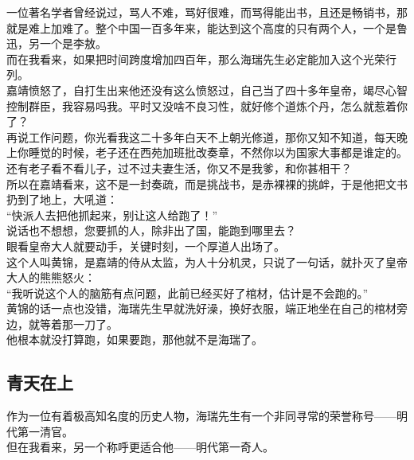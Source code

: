 \begin{multicols}{\theparacolNo}
一位著名学者曾经说过，骂人不难，骂好很难，而骂得能出书，且还是畅销书，那就是难上加难了。整个中国一百多年来，能达到这个高度的只有两个人，一个是鲁迅，另一个是李敖。\\

而在我看来，如果把时间跨度增加四百年，那么海瑞先生必定能加入这个光荣行列。\\

嘉靖愤怒了，自打生出来他还没有这么愤怒过，自己当了四十多年皇帝，竭尽心智控制群臣，我容易吗我。平时又没啥不良习性，就好修个道炼个丹，怎么就惹着你了？\\

再说工作问题，你光看我这二十多年白天不上朝光修道，那你又知不知道，每天晚上你睡觉的时候，老子还在西苑加班批改奏章，不然你以为国家大事都是谁定的。\\

还有老子看不看儿子，过不过夫妻生活，你又不是我爹，和你甚相干？\\

所以在嘉靖看来，这不是一封奏疏，而是挑战书，是赤裸裸的挑衅，于是他把文书扔到了地上，大吼道：\\

“快派人去把他抓起来，别让这人给跑了！”\\

说话也不想想，您要抓的人，除非出了国，能跑到哪里去？\\

眼看皇帝大人就要动手，关键时刻，一个厚道人出场了。\\

这个人叫黄锦，是嘉靖的侍从太监，为人十分机灵，只说了一句话，就扑灭了皇帝大人的熊熊怒火：\\

“我听说这个人的脑筋有点问题，此前已经买好了棺材，估计是不会跑的。”\\

黄锦的话一点也没错，海瑞先生早就洗好澡，换好衣服，端正地坐在自己的棺材旁边，就等着那一刀了。\\

他根本就没打算跑，如果要跑，那他就不是海瑞了。\\

\subsection{青天在上}
作为一位有着极高知名度的历史人物，海瑞先生有一个非同寻常的荣誉称号——明代第一清官。\\

但在我看来，另一个称呼更适合他——明代第一奇人。\\


\end{multicols}
